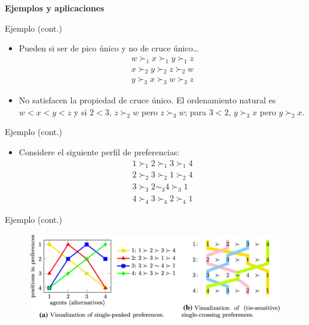 \documentclass[
  ignorenonframetext,
]{beamer}
\providecommand{\tightlist}{%
  \setlength{\itemsep}{0pt}\setlength{\parskip}{0pt}}\usepackage{longtable,booktabs,array}
\begin{document}
\begin{frame}{\textbf{Ejemplos y aplicaciones}}
\begin{block}{Ejemplo (cont.)}
\protect\hypertarget{ejemplo-cont.}{}
\begin{itemize}
\tightlist
\item
  Pueden si ser de pico único y no de cruce único\ldots{}
  \[\begin{aligned}
  w \succ_{1} x \succ_{1} y \succ_{1} z \\
  x \succ_{2} y \succ_{2} z \succ_{2} w \\
  y \succ_{3} x \succ_{3} w \succ_{3} z
  \end{aligned}\]
\item
  No satisfacen la propiedad de cruce único. El ordenamiento natural es
  \(w<x<y<z\) y si \(2<3\), \(z \succ_{2} w\) pero \(z \succ_{3} w\);
  para \(3<2\), \(y \succ_{3} x\) pero \(y \succ_{2} x\).
\end{itemize}
\end{block}

\begin{block}{Ejemplo (cont.)}
\protect\hypertarget{ejemplo-cont.-1}{}
\begin{itemize}
\tightlist
\item
  Considere el siguiente perfil de preferencias: \[\begin{aligned}
  1 \succ_{1} 2 \succ_{1} 3 \succ_{1} 4 \\
  2 \succ_{2} 3 \succ_{2} 1 \succ_{2} 4 \\
  3 \succ_{3} 2 \sim_{3} 4 \succ_{3} 1 \\
  4 \succ_{4} 3 \succ_{4} 2 \succ_{4} 1 
  \end{aligned}\]
\end{itemize}
\end{block}

\begin{block}{Ejemplo (cont.)}
\protect\hypertarget{ejemplo-cont.-2}{}
\begin{figure}

{\centering \includegraphics{../epol/fig/fig-02-005.png}

}


\end{figure}
\end{block}
\end{frame}
\end{document}
